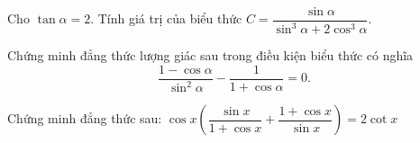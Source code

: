 \begin{bt}%

	Cho $\tan\alpha=2$. Tính giá trị của biểu thức $C=\dfrac{\sin\alpha}{\sin^3\alpha+2\cos^3\alpha}$.
\end{bt}

\begin{bt}%
Chứng minh đẳng thức lượng giác sau trong điều kiện biểu thức có nghĩa
$$
\dfrac{1-\cos \alpha}{\sin ^2 \alpha}-\dfrac{1}{1+\cos \alpha}=0.
$$
\end{bt}

\begin{bt}%
	Chứng minh đẳng thức sau: $\cos x\left(\dfrac{\sin x}{1+\cos x}+\dfrac{1+\cos x}{\sin x}\right)=2 \cot x$
\end{bt}

